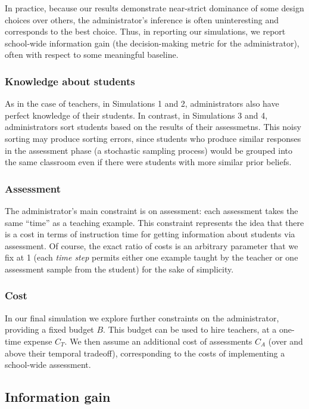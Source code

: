 \documentclass[10pt, letterpaper]{article}
\begin{document}
In practice, because our results demonstrate near-strict dominance of
some design choices over others, the administrator's inference is often
uninteresting and corresponds to the best choice. Thus, in reporting our
simulations, we report school-wide information gain (the decision-making
metric for the administrator), often with respect to some meaningful
baseline.

\subsubsection{Knowledge about students}\label{knowledge-about-students}

As in the case of teachers, in Simulations 1 and 2, administrators also
have perfect knowledge of their students. In contrast, in Simulations 3
and 4, administrators sort students based on the results of their
assessmetns. This noisy sorting may produce sorting errors, since
students who produce similar responses in the assessment phase (a
stochastic sampling process) would be grouped into the same classroom
even if there were students with more similar prior beliefs.

\subsubsection{Assessment}\label{assessment}

The administrator's main constraint is on assessment: each assessment
takes the same ``time'' as a teaching example. This constraint
represents the idea that there is a cost in terms of instruction time
for getting information about students via assessment. Of course, the
exact ratio of costs is an arbitrary parameter that we fix at 1 (each
\emph{time step} permits either one example taught by the teacher or one
assessment sample from the student) for the sake of simplicity.

\subsubsection{Cost}\label{cost}

In our final simulation we explore further constraints on the
administrator, providing a fixed budget \(B\). This budget can be used
to hire teachers, at a one-time expense \(C_T\). We then assume an
additional cost of assessments \(C_A\) (over and above their temporal
tradeoff), corresponding to the costs of implementing a school-wide
assessment.

\subsection{Information gain}\label{information-gain}
\end{document}
